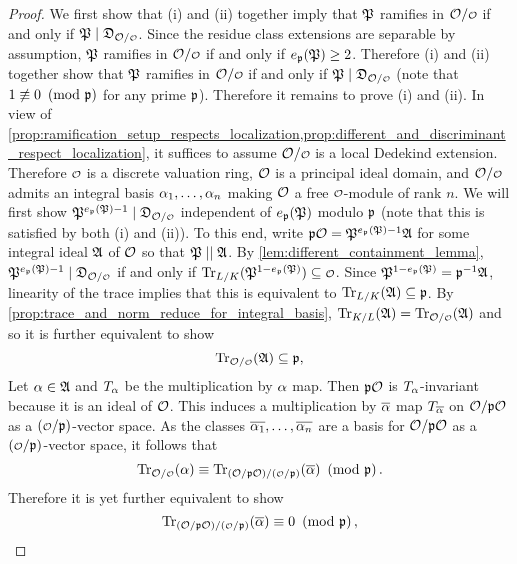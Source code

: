     \begin{proof}
      We first show that (i) and (ii) together imply that $\mathfrak{P}$ ramifies in $\mc{O}/\smc{O}$ if and only if $\mf{P} \mid \mf{D}_{\mc{O}/\smc{O}}$. Since the residue class extensions are separable by assumption, $\mathfrak{P}$ ramifies in $\mc{O}/\smc{O}$ if and only if $e_{\mathfrak{p}}(\mathfrak{P}) \ge 2$. Therefore (i) and (ii) together show that $\mathfrak{P}$ ramifies in $\mc{O}/\smc{O}$ if and only if $\mf{P} \mid \mf{D}_{\mc{O}/\smc{O}}$ (note that $1 \not\equiv 0 \ \left(\text{mod }\mathfrak{p}\right)$ for any prime $\mathfrak{p}$). Therefore it remains to prove (i) and (ii). In view of \cref{prop:ramification_setup_respects_localization,prop:different_and_discriminant_respect_localization}, it suffices to assume $\mc{O}/\smc{O}$ is a local Dedekind extension. Therefore $\smc{O}$ is a discrete valuation ring, $\mathcal{O}$ is a principal ideal domain, and $\mc{O}/\smc{O}$ admits an integral basis $\alpha_{1},\ldots,\alpha_{n}$ making $\mathcal{O}$ a free $\smc{O}$-module of rank $n$. We will first show $\mf{P}^{e_{\mf{p}}(\mf{P})-1} \mid \mf{D}_{\mc{O}/\smc{O}}$ independent of $e_{\mathfrak{p}}(\mathfrak{P})$ modulo $\mathfrak{p}$ (note that this is satisfied by both (i) and (ii)). To this end, write $\mathfrak{p}\mathcal{O} = \mathfrak{P}^{e_{\mathfrak{p}}(\mathfrak{P})-1}\mathfrak{A}$ for some integral ideal $\mathfrak{A}$ of $\mathcal{O}$ so that $\mathfrak{P} \mid\mid \mathfrak{A}$. By \cref{lem:different_containment_lemma}, $\mf{P}^{e_{\mf{p}}(\mf{P})-1} \mid \mf{D}_{\mc{O}/\smc{O}}$ if and only if $\Trace_{L/K}(\mf{P}^{1-e_{\mf{p}}(\mf{P})}) \subseteq \smc{O}$. Since $\mathfrak{P}^{1-e_{\mathfrak{p}}(\mathfrak{P})} = \mathfrak{p}^{-1}\mathfrak{A}$, linearity of the trace implies that this is equivalent to $\operatorname{\mathrm{Tr}}_{L/K}(\mathfrak{A}) \subseteq \mathfrak{p}$. By \cref{prop:trace_and_norm_reduce_for_integral_basis}, $\Trace_{K/L}(\mf{A}) = \Trace_{\mc{O}/\smc{O}}(\mf{A})$ and so it is further equivalent to show
      \[
        \Trace_{\mc{O}/\smc{O}}(\mf{A}) \subseteq \mf{p},
      \]
      Let $\alpha \in \mathfrak{A}$ and $T_{\alpha}$ be the multiplication by $\alpha$ map. Then $\mathfrak{p}\mathcal{O}$ is $T_{\alpha}$-invariant because it is an ideal of $\mathcal{O}$. This induces a multiplication by $\overline{\alpha}$ map $T_{\overline{\alpha}}$ on $\mathcal{O}/\mathfrak{p}\mathcal{O}$ as a $(\smc{O}/\mf{p})$-vector space. As the classes $\overline{\alpha_{1}},\ldots,\overline{\alpha_{n}}$ are a basis for $\mathcal{O}/\mathfrak{p}\mathcal{O}$ as a $(\smc{O}/\mf{p})$-vector space, it follows that
      \[
        \Trace_{\mc{O}/\smc{O}}(\a) \equiv \Trace_{(\mc{O}/\mf{p}\mc{O})/(\smc{O}/\mf{p})}(\conj{\a}) \tmod{\mf{p}}.
      \]
      Therefore it is yet further equivalent to show
      \[
        \Trace_{(\mc{O}/\mf{p}\mc{O})/(\smc{O}/\mf{p})}(\conj{\a}) \equiv 0 \tmod{\mf{p}},
\]
\end{proof}
